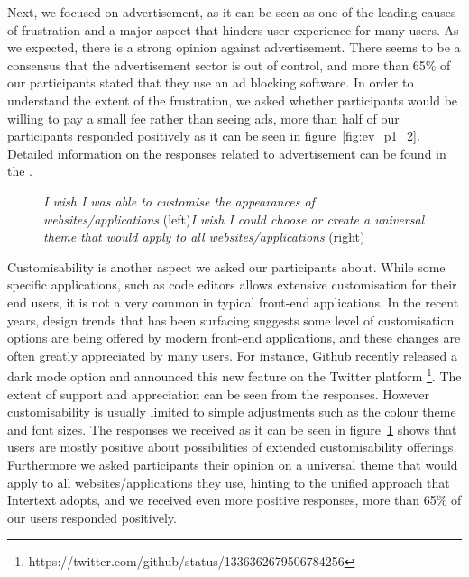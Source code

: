 Next, we focused on advertisement, as it can be seen as one of the leading causes of frustration and a major aspect that hinders user experience for many users. As we expected, there is a strong opinion against advertisement. There seems to be a consensus that the advertisement sector is out of control, and more than 65\% of our participants stated that they use an ad blocking software. In order to understand the extent of the frustration, we asked whether participants would be willing to pay a small fee rather than seeing ads, more than half of our participants responded positively as it can be seen in figure~\ref{fig:ev_p1_2}. Detailed information on the responses related to advertisement can be found in the .


\begin{figure}[H]
\centering
{}
\vspace*{-5mm}
\caption{\newline\textit{I wish I was able to customise the appearances of websites/applications} (left)\newline\textit{I wish I could choose or create a universal theme that would apply to all websites/applications} (right)} \label{fig:ev_p1_3}
\end{figure}

Customisability is another aspect we asked our participants about. While some specific applications, such as code editors allows extensive customisation for their end users, it is not a very common in typical front-end applications. In the recent years, design trends that has been surfacing suggests some level of customisation options are being offered by modern front-end applications, and these changes are often greatly appreciated by many users. For instance, Github recently released a dark mode option and announced this new feature on the Twitter platform \footnote{https://twitter.com/github/status/1336362679506784256}. The extent of support and appreciation can be seen from the responses. However customisability is usually limited to simple adjustments such as the colour theme and font sizes. The responses we received as it can be seen in figure~\ref{fig:ev_p1_3} shows that users are mostly positive about possibilities of extended customisability offerings. Furthermore we asked participants their opinion on a universal theme that would apply to all websites/applications they use, hinting to the unified approach that Intertext adopts, and we received even more positive responses, more than 65\% of our users responded positively.

